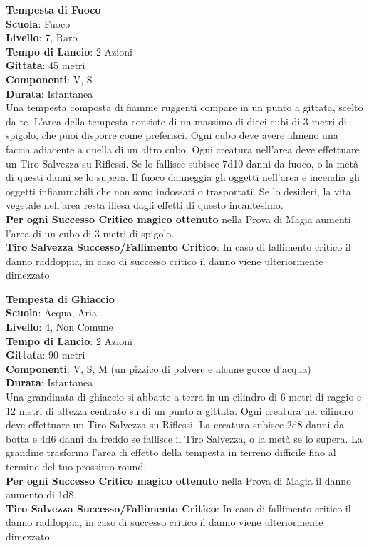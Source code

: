 \begin{multicols}{2}
\medskip\textbf{Tempesta di Fuoco}\\
\textbf{Scuola}: Fuoco\\
\textbf{Livello}: 7, Raro\\
\textbf{Tempo di Lancio}: 2 Azioni\\
\textbf{Gittata}: 45 metri\\
\textbf{Componenti}: V, S\\
\textbf{Durata}: Istantanea\\
Una tempesta composta di fiamme ruggenti compare in un punto a gittata, scelto da te. L'area della tempesta consiste di un massimo di dieci cubi di 3 metri di spigolo, che puoi disporre come preferisci. Ogni cubo deve avere almeno una faccia adiacente a quella di un altro cubo. Ogni creatura nell'area deve effettuare un Tiro Salvezza su Riflessi. Se lo fallisce subisce 7d10 danni da fuoco, o la metà di questi danni se lo supera. Il fuoco danneggia gli oggetti nell'area e incendia gli oggetti infiammabili che non sono indossati o trasportati. Se lo desideri, la vita vegetale nell'area resta illesa dagli effetti di questo incantesimo. \\
\textbf{Per ogni Successo Critico magico ottenuto} nella Prova di Magia aumenti l'area di un cubo di 3 metri di spigolo. \\
\textbf{Tiro Salvezza Successo/Fallimento Critico}: In caso di fallimento critico il danno raddoppia, in caso di successo critico il danno viene ulteriormente dimezzato

\medskip\textbf{Tempesta di Ghiaccio}\\
\textbf{Scuola}: Acqua, Aria\\
\textbf{Livello}: 4, Non Comune\\
\textbf{Tempo di Lancio}: 2 Azioni\\
\textbf{Gittata}: 90 metri\\
\textbf{Componenti}: V, S, M (un pizzico di polvere e alcune gocce d'acqua)\\
\textbf{Durata}: Istantanea\\
Una grandinata di ghiaccio si abbatte a terra in un cilindro di 6 metri di raggio e 12 metri di altezza centrato su di un punto a gittata. Ogni creatura nel cilindro deve effettuare un Tiro Salvezza su Riflessi. La creatura subisce 2d8 danni da botta e 4d6 danni da freddo se fallisce il Tiro Salvezza, o la metà se lo supera. La grandine trasforma l'area di effetto della tempesta in terreno difficile fino al termine del tuo prossimo round.\\
\textbf{Per ogni Successo Critico magico ottenuto} nella Prova di Magia il danno aumento di 1d8.\\
\textbf{Tiro Salvezza Successo/Fallimento Critico}: In caso di fallimento critico il danno raddoppia, in caso di successo critico il danno viene ulteriormente dimezzato


\end{multicols}

